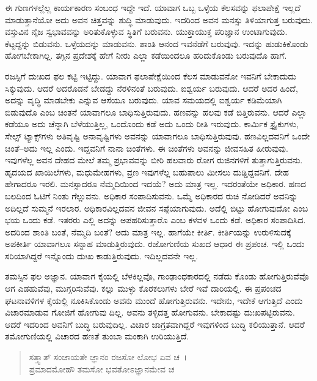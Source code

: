 ಈ ಗುಣಗಳಲ್ಲೆಲ್ಲ ಕಾರ್ಯಕಾರಣ ಸಂಬಂಧ ಇದ್ದೇ ಇದೆ. ಯಾವಾಗ ಒಬ್ಬ ಒಳ್ಳೆಯ ಕೆಲಸವನ್ನು ಫಲಾಪೇಕ್ಷೆ ಇಲ್ಲದೆ ಮಾಡುತ್ತಾನೆಯೋ ಅದು ಅವನ ಚಿತ್ತವನ್ನು ಶುದ್ಧಿ ಮಾಡುವುದು. ಇದರಿಂದ ಅವನ ಮನಸ್ಸು ತಿಳಿಯಾಗುತ್ತ ಬರುವುದು. ವಸ್ತುವಿನ ನೈಜ ಸ್ವಭಾವವನ್ನು ಅರಿತುಕೊಳ್ಳುವ ಸ್ಥಿತಿಗೆ ಬರುವನು. ಯುಕ್ತಾಯುಕ್ತ ಪರಿಜ್ಞಾನ ಉಂಟಾಗುವುದು. ಕೆಟ್ಟದ್ದನ್ನು ಬಿಡುವನು. ಒಳ್ಳೆಯದನ್ನು ಮಾಡುವನು. ಶಾಂತಿ ಆನಂದ ಇವನೆಡೆಗೆ ಬರುವುವು. ಇದನ್ನು ಹುಡುಕಿಕೊಂಡು ಹೋಗಬೇಕಾಗಿಲ್ಲ. ತಗ್ಗಿನ ಪ್ರದೇಶಕ್ಕೆ ಹೇಗೆ ನೀರು ಎಲ್ಲಾ ಕಡೆಯಿಂದಲೂ ಹರಿದುಕೊಂಡು ಬರುವುದೊ ಹಾಗೆ.

ರಜಸ್ಸಿಗೆ ದುಃಖದ ಫಲ ಕಟ್ಟಿ ಇಟ್ಟಿದ್ದು. ಯಾವಾಗ ಫಲಾಪೇಕ್ಷೆಯಿಂದ ಕೆಲಸ ಮಾಡುವನೋ ಇವನಿಗೆ ಬೇಕಾದುದು ಸಿಕ್ಕುವುದು. ಆದರೆ ಅದರೊಡನೆ ಬೇಡದ್ದು ನೆರಳಿನಂತೆ ಬರುವುದು. ಐಶ್ವರ್ಯ ಬರುವುದು. ಆದರೆ ಅದರ ಹಿಂದೆ, ಅದನ್ನು ವೃದ್ಧಿ ಮಾಡಬೇಕು ಎನ್ನುವ ಆಸೆಯೂ ಬರುವುದು. ಯಾವ ಸಮಯದಲ್ಲಿ ಐಶ್ವರ್ಯ ಕಡಿಮೆಯಾಗಿ ಬಿಡುವುದೊ ಎಂಬ ಚಿಂತನೆ ಯಾವಾಗಲೂ ಬಾಧಿಸುತ್ತಿರುವುದು. ಹಣವನ್ನು ಹಲವು ಕಡೆ ಬಿತ್ತಿರುವನು. ಆದರೆ ಎಲ್ಲಾ ಕಡೆಯೂ ಅದು ಚೆನ್ನಾಗಿ ಬೆಳೆಯುತ್ತಿಲ್ಲ, ಒಂದೊಂದು ಕಡೆ ಅದು ಒಂದು ರೀತಿ ಇರುವುದು. ಕಾರ್ಮಿಕ ಸ್ಟ್ರೈಕುಗಳು, ಸೇಲ್ಸ್ ಟ್ಯಾಕ್ಸ್​ಗಳು ಅತಿವೃಷ್ಟಿ ಅನಾವೃಷ್ಟಿಗಳು ಅವನನ್ನು ಯಾವಾಗಲೂ ಬಾಧಿಸುತ್ತಿರುವುವು. ಹಣವಿಲ್ಲದವನಿಗೆ ಒಂದೇ ಚಿಂತೆ--ಅದು ಇಲ್ಲ ಎಂದು. ಇದ್ದವನಿಗೆ ನಾನಾ ಚಿಂತೆಗಳು. ಈ ಚಿಂತೆಗಳು ಅವನನ್ನು ಜೀವಸಹಿತ ಹೀರುವುವು. ಇವುಗಳೆಲ್ಲ ಅವನ ದೇಹದ ಮೇಲೆ ತಮ್ಮ ಪ್ರಭಾವವನ್ನು ಬೀರಿ ಹಲವಾರು ರೋಗ ರುಜಿನಗಳಿಗೆ ತುತ್ತಾಗುತ್ತಿರುವನು. ಹೃದಯದ ಖಾಯಿಲೆಗಳು, ಮಧುಮೇಹಗಳು, ವ್ರಣ ಇವುಗಳೆಲ್ಲ ಬಹುಪಾಲು ಮೀಸಲು ದುಡ್ಡಿದ್ದವನಿಗೆ. ದೇಹ ಹೇಗಾದರೂ ಇರಲಿ. ಮನಸ್ಸಾದರೂ ನೆಮ್ಮದಿಯಿಂದ ಇದಯೆ? ಅದು ಮಾತ್ರ ಇಲ್ಲ. ಇದರಂತೆಯೇ ಅಧಿಕಾರ. ಹಣದ ಬಲದಿಂದ ಓಟಿಗೆ ನಿಂತು ಗೆಲ್ಲುವನು. ಅಧಿಕಾರ ಸಂಪಾದಿಸುವನು. ಒಮ್ಮೆ ಅಧಿಕಾರದ ರುಚಿ ನೋಡಿದರೆ ಅವನಿನ್ನು ಅದಿಲ್ಲದೆ ಸುಮ್ಮನೆ ಇರಲಾರ. ಅಧಿಕಾರವಿಲ್ಲದವನ ಜೀವನ ಸಪ್ಪೆಯಾಗುವುದು. ಅದೆಲ್ಲಿ ಬಿಟ್ಟು ಹೋಗುವುದೋ ಎಂಬ ಭಯ ಒಂದು ಕಡೆ. ಇತರರು ಎಲ್ಲಿ ಅದನ್ನು ಅಪಹರಿಸುತ್ತಾರೊ ಎಂಬ ಕಳವಳ ಒಂದು ಕಡೆ. ಅಧಿಕಾರ ಸಂಪಾದಿಸಿದ. ಅದರಿಂದ ಶಾಂತಿ ಬಂತೆ, ನೆಮ್ಮದಿ ಬಂತೆ? ಅದು ಮಾತ್ರ ಇಲ್ಲ. ಹಾಗೆಯೇ ಕೀರ್ತಿ. ಕೀರ್ತಿಯನ್ನು ಉರುಳಿಸುದಕ್ಕೆ ಅಪಕೀರ್ತಿ ಯಾವಾಗಲೂ ಸನ್ನಾಹ ಮಾಡುತ್ತಿರುವುದು. ರಜೋಗುಣಿಯ ಸುಖದ ಆಧಾರ ಈ ಪ್ರಪಂಚ. ಇಲ್ಲಿ ಒಂದು ಸರಿಯಾಗಿದ್ದರೆ ಇನ್ನೊಂದು ದುಃಖ ಕಾಡುತ್ತಿರುವುದು. ಇದಿಲ್ಲದವನೇ ಇಲ್ಲ.

ತಮಸ್ಸಿನ ಫಲ ಅಜ್ಞಾನ. ಯಾವಾಗ ಕೈಯಲ್ಲಿ ಬೆಳಕಿಲ್ಲವೊ, ಗಾಂಢಾಂಧಕಾರದಲ್ಲಿ ನಡೆದು ಕೊಂಡು ಹೋಗುತ್ತಿರುವೆವೊ ಆಗ ಎಡಹುವೆವು, ಮುಗ್ಗರಿಸುವೆವು. ಕಲ್ಲು ಮುಳ್ಳು ಕೊರಕಲುಗಳು ಬೇರೆ ಇವೆ ದಾರಿಯಲ್ಲಿ. ಈ ಪ್ರಪಂಚದ ಘಟನಾವಳಿಗಳ ಕೈಯಲ್ಲಿ ನೂಕಿಸಿಕೊಂಡು ಅವನು ಮುಂದೆ ಹೋಗುತ್ತಿರುವನು. ಇದೇನು, ಇದೇಕೆ ಆಗುತ್ತಿದೆ ಎಂದು ವಿಚಾರಮಾಡುವ ಗೋಜಿಗೆ ಹೋಗುವು ದಿಲ್ಲ. ಅವನು ತಳ್ಳಿದತ್ತ ಹೋಗುವನು. ಬೇಕಾದಷ್ಟು ದುಃಖಪಟ್ಟಿರುವನು. ಆದರೆ ಇದರಿಂದ ಅವನಿಗೆ ಬುದ್ಧಿ ಬರುವುದಿಲ್ಲ. ವಿಚಾರ ಜಾಗ್ರತವಾಗಿದ್ದರೆ ಇವುಗಳಿಂದ ಬುದ್ಧಿ ಕಲಿಯುತ್ತಾನೆ. ಆದರೆ ತಮೋಗುಣಿಯಲ್ಲಿ ವಿಚಾರದ ಹಣತೆ ತುಂಬಾ ಮಂಕಾಗಿ ಉರಿಯುತ್ತಿದೆ.

\begin{verse}
ಸತ್ತ್ವಾತ್ ಸಂಜಾಯತೇ ಜ್ಞಾನಂ ರಜಸೋ ಲೋಭ ಏವ ಚ~।\\ಪ್ರಮಾದಮೋಹೌ ತಮಸೋ ಭವತೋಽಜ್ಞಾನಮೇವ ಚ 
\end{verse}

